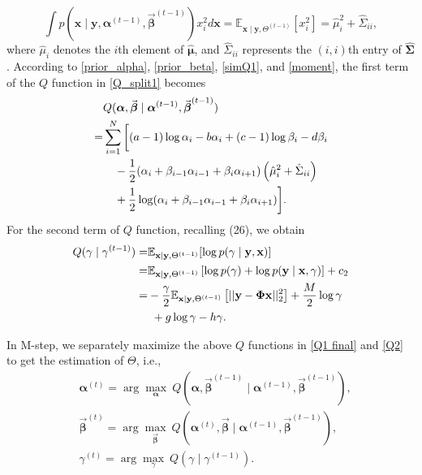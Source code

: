 \documentclass[lettersize,journal]{IEEEtran}
\theoremstyle{remark}
\begin{document}
\begin{equation}
	\int p(\mathbf{x}\mid \mathbf{y}, \boldsymbol{\alpha}^{(t-1)}, \vec{\boldsymbol{\beta}}^{(t-1)}) x_i^2 d \mathbf{x} =\mathbb{E}_{\mathbf{x} \mid \mathbf{y}, \Theta^{(t-1)}}[x_i^2]= \hat{\mu}_i^2 + \hat{\Sigma}_{ii},\label{moment}
\end{equation}
where \( \hat{\mu}_i \) denotes the \( i \)th element of \( \hat{\boldsymbol{\mu}} \), and \( \hat{\Sigma}_{ii} \) represents the \( (i,i) \)th entry of \( \hat{\boldsymbol{\Sigma}} \). According to \eqref{prior_alpha}, \eqref{prior_beta}, \eqref{simQ1}, and \eqref{moment}, the first term of the $Q$ function in \eqref{Q_split1} becomes
\begin{align}
	&Q(\boldsymbol{\alpha}, \vec{\boldsymbol{\beta}} \mid \boldsymbol{\alpha}^{(t-1)}, \vec{\boldsymbol{\beta}}^{(t-1)})\notag \\
	=& \sum_{i=1}^{N} \bigg[ (a-1) \log \alpha_i - b \alpha_{i} + (c-1) \log \beta_{i} - d\beta_{i} \notag \\
	&\quad - \frac{1}{2} (\alpha_i + \beta_{i-1} \alpha_{i-1} + \beta_i \alpha_{i+1}) 
	\left(\hat{\mu}_i^2 + \hat{\Sigma}_{ii} \right) \notag \\
	&\quad + \frac{1}{2} \log (\alpha_i + \beta_{i-1} \alpha_{i-1} + \beta_i \alpha_{i+1})\bigg].\label{Q1 final}
\end{align}
For the second term of  $Q$ function, recalling (26), we obtain
\begin{align}
	Q(\gamma \mid \gamma^{(t-1)})=&\mathbb{E}_{\mathbf{x} \mid \mathbf{y}, \Theta^{(t-1)}} [\log p(\gamma \mid \mathbf{y}, \mathbf{x})]\notag\\
	=&\mathbb{E}_{\mathbf{x} \mid \mathbf{y}, \Theta^{(t-1)}}\left[\log p(\gamma)+\log p(\mathbf{y} \mid \mathbf{x},\gamma)\right]+c_2\notag\\
	=& -\frac{\gamma}{2} \mathbb{E}_{\mathbf{x} \mid \mathbf{y}, \Theta^{(t-1)}}\left[\vert| \mathbf{y}-\boldsymbol{\Phi} \mathbf{x}\vert|_2^2\right]+\frac{M}{2}\log \gamma \notag\\
	&~+g \log \gamma -h\gamma . \label{Q2}
\end{align}

In M-step, we separately maximize the above $Q$ functions in \eqref{Q1 final} and \eqref{Q2} to get the estimation of $\Theta$, i.e.,
\begin{align}
	&\boldsymbol{\alpha}^{(t)} = \arg \max_{\boldsymbol{\alpha}}~Q(\boldsymbol{\alpha}, \vec{\boldsymbol{\beta}}^{(t-1)} \mid \boldsymbol{\alpha}^{(t-1)}, \vec{\boldsymbol{\beta}}^{(t-1)}), \label{Max_alpha}\\
&	\vec{\boldsymbol{\beta}}^{(t)} = \arg \max_{\vec{\boldsymbol{\beta}}}~Q(\boldsymbol{\alpha}^{(t)}, \vec{\boldsymbol{\beta}} \mid \boldsymbol{\alpha}^{(t-1)}, \vec{\boldsymbol{\beta}}^{(t-1)}), \label{Max_beta}\\
& \gamma^{(t)} =  \arg \max_{\gamma}~Q(\gamma \mid \gamma^{(t-1)}).\label{Max_gamma}
\end{align}
\end{document}

